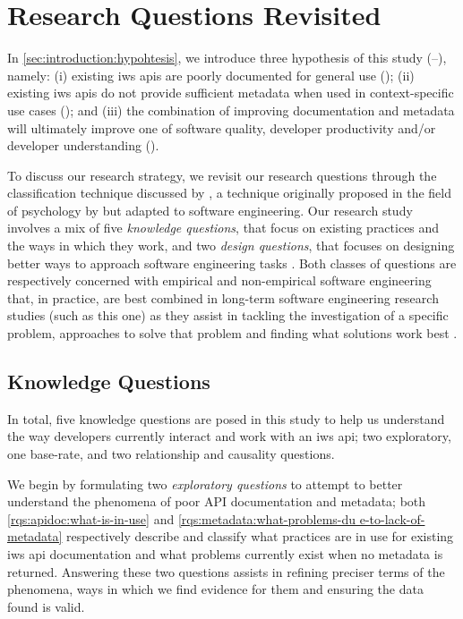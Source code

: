 \section{Research Questions Revisited}
\label{sec:research-methodology:research-questions}

In \cref{sec:introduction:hypohtesis}, we introduce three hypothesis of this study (--), namely: (i) existing \gls{iws} \glspl{api} are poorly documented for general use (); (ii) existing \gls{iws} \glspl{api} do not provide sufficient metadata when used in context-specific use cases (); and (iii) the combination of improving documentation and metadata will ultimately improve one of software quality, developer productivity and/or developer understanding ().

To discuss our research strategy, we revisit our research questions through the classification technique discussed by \citet{Easterbrook:2007ws}, a technique originally proposed in the field of psychology by \citet{Meltzoff:1998wg} but adapted to software engineering. Our research study involves a mix of five \textit{knowledge questions}, that focus on existing practices and the ways in which they work, and two \textit{design questions}, that focuses on designing better ways to approach software engineering tasks \citep{Simon:1996uw}. Both classes of questions are respectively concerned with empirical and non-empirical software engineering that, in practice, are best combined in long-term software engineering research studies (such as this one) as they assist in tackling the investigation of a specific problem, approaches to solve that problem and finding what solutions work best \citep{Wieringa:2006vd}.

\subsection{Knowledge Questions}
\label{ssec:research-methodology:research-questions:knowledge-questions}

In total, five knowledge questions are posed in this study to help us understand the way developers currently interact and work with an \gls{iws} \gls{api}; two exploratory, one base-rate, and two relationship and causality questions.

We begin by formulating two \textit{exploratory questions} to attempt to better understand the phenomena of poor API documentation and metadata; both \ref{rqs:apidoc:what-is-in-use} and \ref{rqs:metadata:what-problems-du                                                                e-to-lack-of-metadata} respectively describe and classify what practices are in use for existing \gls{iws} \gls{api} documentation and what problems currently exist when no metadata is returned. Answering these two questions assists in refining preciser terms of the phenomena, ways in which we find evidence for them and ensuring the data found is valid.

